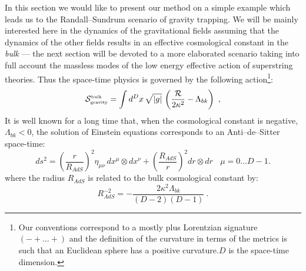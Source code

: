 \documentclass[a4paper,12pt]{article}
\def\action{{\cal S}}
\def\courbure{{\cal R}}
\def\Rads{R_{\scriptscriptstyle AdS}}
\begin{document}
In this section we would like to present our method on a simple
example which leads us to the Randall--Sundrum scenario of gravity trapping.
We will be mainly interested  here in the dynamics of the gravitational
fields assuming that the dynamics of the other fields results in an effective
cosmological constant in the {\it bulk} --- the next section will be devoted
to a more elaborated scenario taking into full account the massless modes
of the low energy effective action of superstring theories.
Thus the space-time physics is governed by the following action\footnote{Our
conventions correspond to a mostly plus Lorentzian signature $(-+\ldots +)$
and the definition of the curvature in terms of the metrics is such that an
Euclidean sphere has a positive curvature.$D$ is the space-time dimension.}:
%
\begin{equation}
\action_{\mbox{\tiny gravity}}^{\mbox{\tiny bulk}}
= \int d^{D} x\, \sqrt{|g|}\,
\left( \frac{\courbure}{2\kappa^2} - \Lambda_{bk}
\right) \ ,
\end{equation}
%
It is well known for a long time that, when the cosmological constant
is negative, $\Lambda_{bk}<0$, the solution of Einstein equations corresponds
to an Anti--de--Sitter space-time:
%
\begin{equation}
	\label{eq:AdS}
ds^2 = \left( \frac{r}{\Rads} \right)^2 \eta_{\mu\nu} \, dx^\mu \otimes dx^\nu
+ \left( \frac{\Rads}{r} \right)^2 dr \otimes dr
\ \ \ \
\mu=0\ldots D-1 .
\end{equation}
%
where the radius $\Rads$ is related to the bulk cosmological constant by:
%
\begin{equation}
\Rads^{-2} = - \frac{2 \kappa^2 \Lambda_{bk}}{(D-2)(D-1)}
\ .
\end{equation}
%
\end{document}
